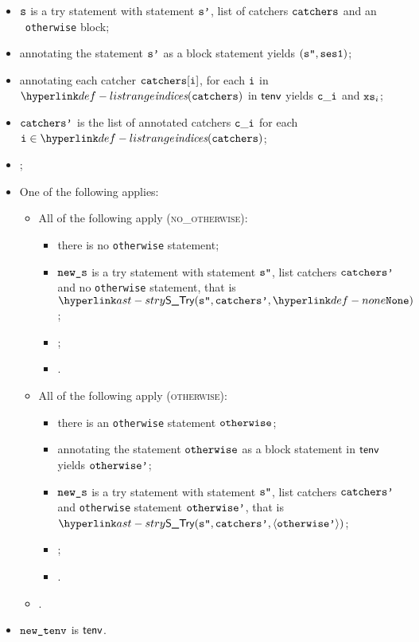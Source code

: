 \begin{itemize}
  \item $\texttt{s}$ is a try statement with statement $\texttt{s'}$, list of catchers $\texttt{catchers}$ and an \optional\ \texttt{otherwise} block;
  \item annotating the statement $\texttt{s'}$ as a block statement yields $(\texttt{s''}, \texttt{ses1})$\ProseOrTypeError;
  \item annotating each catcher $\texttt{catchers}[\texttt{i}]$, for each $\texttt{i}$ in $\listrange(\catchers)$ in $\textsf{tenv}$ yields $\texttt{c}\_\texttt{i}$
        and $\texttt{xs}_i$\ProseOrTypeError;
  \item $\texttt{catchers'}$ is the list of annotated catchers $\texttt{c}\_\texttt{i}$ for each $\vi\in\listrange(\catchers)$;
  \item {};
  \item One of the following applies:
  \begin{itemize}
    \item All of the following apply (\textsc{no\_otherwise}):
    \begin{itemize}
      \item there is no \texttt{otherwise} statement;
      \item $\texttt{new\_s}$ is a try statement with statement $\texttt{s''}$, list catchers $\texttt{catchers'}$ and no \texttt{otherwise} statement,
            that is \\
            $\STry(\vspp, \catchersp, \None)$;
      \item {};
      \item \Proseeqdef{$\vsesthree$}{$\vsestwo$}.
    \end{itemize}

    \item All of the following apply (\textsc{otherwise}):
    \begin{itemize}
      \item there is an \texttt{otherwise} statement $\texttt{otherwise}$;
      \item annotating the statement $\texttt{otherwise}$ as a block statement in $\textsf{tenv}$ yields $\texttt{otherwise'}$\ProseOrTypeError;
      \item $\texttt{new\_s}$ is a try statement with statement $\texttt{s''}$, list catchers $\texttt{catchers'}$ and \texttt{otherwise} statement
            $\texttt{otherwise'}$, that is \\
            $\STry(\vspp, \catchersp, \langle\otherwisep\rangle)$;
      \item \Proseeqdef{$\vsesotherwise$}{$\vsesblock$};
      \item {}.
    \end{itemize}

    \item {}.
  \end{itemize}
  \item $\texttt{new\_tenv}$ is $\textsf{tenv}$.
\end{itemize}

